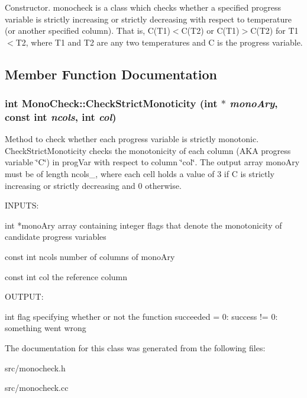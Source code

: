 Constructor. monocheck is a class which checks whether a specified progress variable is strictly increasing or strictly decreasing with respect to temperature (or another specified column). That is, C(T1)$<$C(T2) or C(T1)$>$C(T2) for T1$<$T2, where T1 and T2 are any two temperatures and C is the progress variable. 

\subsection{Member Function Documentation}
\hypertarget{classMonoCheck_af34f3d72ec2d1575526d42bfe4cdfe7a}{
\subsubsection[{CheckStrictMonoticity}]{\setlength{\rightskip}{0pt plus 5cm}int MonoCheck::CheckStrictMonoticity (int $\ast$ {\em monoAry}, \/  const int {\em ncols}, \/  int {\em col})}}
\label{d8/ddf/classMonoCheck_af34f3d72ec2d1575526d42bfe4cdfe7a}


Method to check whether each progress variable is strictly monotonic. CheckStrictMonoticity checks the monotonicity of each column (AKA progress variable \char`\"{}C\char`\"{}) in progVar with respect to column \char`\"{}col\char`\"{}. The output array monoAry must be of length ncols\_\-, where each cell holds a value of 3 if C is strictly increasing or strictly decreasing and 0 otherwise.

\begin{DoxyVerb}
INPUTS:

int *monoAry        array containing integer flags that denote the monotonicity of candidate progress variables

const int ncols     number of columns of monoAry

const int col       the reference column


OUTPUT:

int                 flag specifying whether or not the function succeeded
                     = 0: success
		    != 0: something went wrong

\end{DoxyVerb}
 

The documentation for this class was generated from the following files:\begin{DoxyCompactItemize}
\item 
src/monocheck.h\item 
src/monocheck.cc\end{DoxyCompactItemize}
